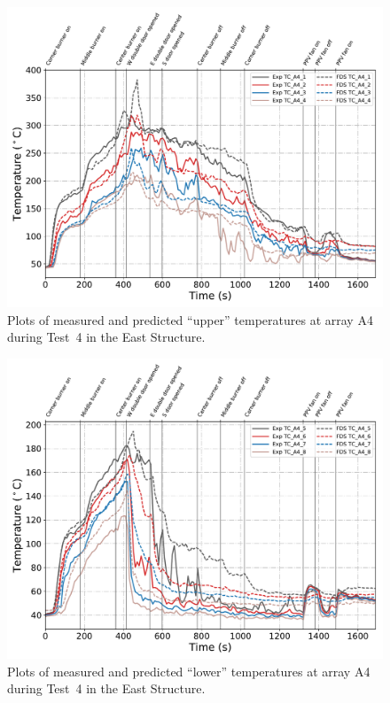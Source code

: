 \clearpage
\begin{figure}[p]
	\centering
	\includegraphics[width=\columnwidth]{Figures/Plots/Validation/Temperature/Test_4_TC_A4_upper}
	\caption{Plots of measured and predicted ``upper'' temperatures at array A4 during Test~4 in the East Structure.}
	\label{fig:TCA4_upper_data_Test4}
\end{figure}
\begin{figure}[p]
	\centering
	\includegraphics[width=\columnwidth]{Figures/Plots/Validation/Temperature/Test_4_TC_A4_lower}
	\caption{Plots of measured and predicted ``lower'' temperatures at array A4 during Test~4 in the East Structure.}
	\label{fig:TCA4_lower_data_Test4}
\end{figure}

